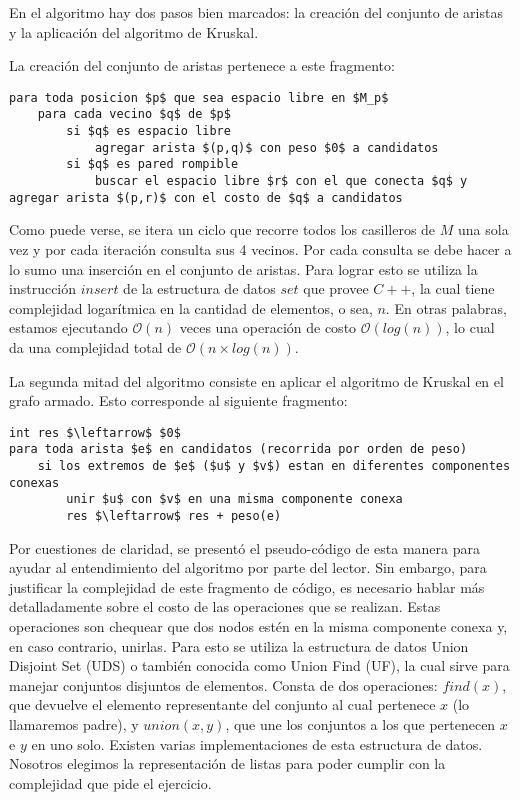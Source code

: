 En el algoritmo hay dos pasos bien marcados: la creación del conjunto de aristas y la aplicación del algoritmo de Kruskal.

La creación del conjunto de aristas pertenece a este fragmento:

\begin{lstlisting}
para toda posicion $p$ que sea espacio libre en $M_p$
	para cada vecino $q$ de $p$
		si $q$ es espacio libre
			agregar arista $(p,q)$ con peso $0$ a candidatos
		si $q$ es pared rompible
			buscar el espacio libre $r$ con el que conecta $q$ y agregar arista $(p,r)$ con el costo de $q$ a candidatos
\end{lstlisting}

Como puede verse, se itera un ciclo que recorre todos los casilleros de $M$ una sola vez y por cada iteración consulta sus 4 vecinos. Por cada consulta se debe hacer a lo sumo una inserción en el conjunto de aristas. Para lograr esto se utiliza la instrucción $insert$ de la estructura de datos $set$ que provee $C++$, la cual tiene complejidad logarítmica en la cantidad de elementos, o sea, $n$. En otras palabras, estamos ejecutando $\mathcal{O}(n)$ veces una operación de costo $\mathcal{O}(log(n))$, lo cual da una complejidad total de $\mathcal{O}(n \times log(n))$.

La segunda mitad del algoritmo consiste en aplicar el algoritmo de Kruskal en el grafo armado. Esto corresponde al siguiente fragmento:

\begin{lstlisting}
int res $\leftarrow$ $0$
para toda arista $e$ en candidatos (recorrida por orden de peso)
	si los extremos de $e$ ($u$ y $v$) estan en diferentes componentes conexas
		unir $u$ con $v$ en una misma componente conexa
		res $\leftarrow$ res + peso(e)
\end{lstlisting}

Por cuestiones de claridad, se presentó el pseudo-código de esta manera para ayudar al entendimiento del algoritmo por parte del lector. Sin embargo, para justificar la complejidad de este fragmento de código, es necesario hablar más detalladamente sobre el costo de las operaciones que se realizan. Estas operaciones son chequear que dos nodos estén en la misma componente conexa y, en caso contrario, unirlas. Para esto se utiliza la estructura de datos Union Disjoint Set (UDS) o también conocida como Union Find (UF), la cual sirve para manejar conjuntos disjuntos de elementos. Consta de dos operaciones: $find(x)$, que devuelve el elemento representante del conjunto al cual pertenece $x$ (lo llamaremos padre), y $union(x,y)$, que une los conjuntos a los que pertenecen $x$ e $y$ en uno solo. Existen varias implementaciones de esta estructura de datos. Nosotros elegimos la representación de listas para poder cumplir con la complejidad que pide el ejercicio.

